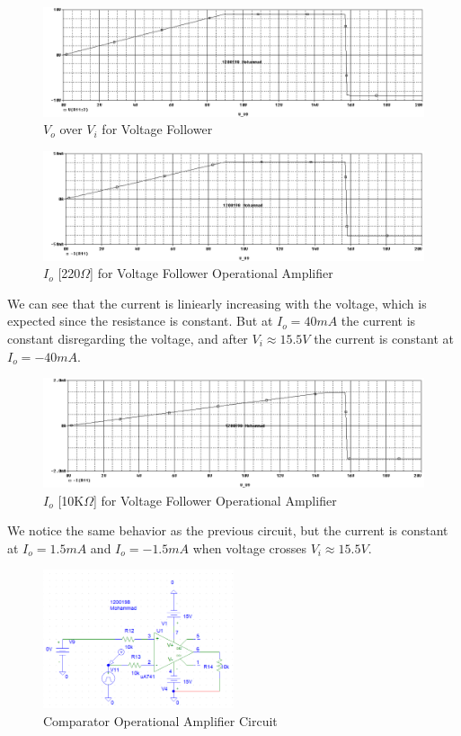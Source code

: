 \documentclass[12pt]{article}
\begin{document}
\begin{figure}[H]
    \centering
    \includegraphics[width=\textwidth]{assets/main/2023-08-20-13-59-33.png}
    \caption{$V_o$ over $V_i$ for Voltage Follower}
\end{figure}
\begin{figure}[H]
    \centering
    \includegraphics[width=\textwidth]{assets/main/2023-08-20-14-03-35.png}
    \caption{$I_o$ [220$\Omega$] for Voltage Follower Operational Amplifier}
\end{figure}
We can see that the current is liniearly increasing with the voltage, which is expected since the resistance is constant. But at $I_o = 40mA$ the current is constant disregarding the voltage, and after $V_i \approx 15.5V$ the current is constant at $I_o = -40mA$.
\begin{figure}[H]
    \centering
    \includegraphics[width=\textwidth]{assets/main/2023-08-20-14-04-48.png}
    \caption{$I_o$ [10K$\Omega$] for Voltage Follower Operational Amplifier}
\end{figure}
We notice the same behavior as the previous circuit, but the current is constant at $I_o = 1.5mA$ and $I_o = -1.5mA$ when voltage crosses $V_i \approx 15.5V$.
\begin{figure}[H]
    \centering
    \includegraphics[width=0.5\textwidth]{assets/main/2023-08-20-14-25-10.png}
    \caption{Comparator Operational Amplifier Circuit}
\end{figure}
\end{document}
